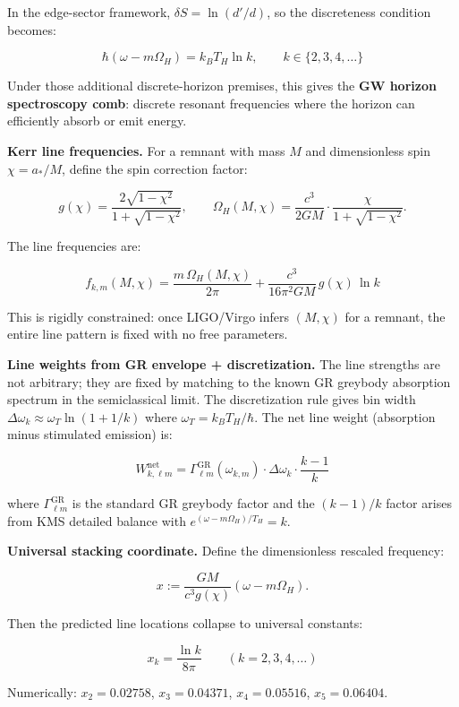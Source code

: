In the edge-sector framework, \(\delta S = \ln(d'/d)\), so the discreteness condition becomes:

\[
\hbar(\omega - m\Omega_H) = k_B T_H \ln k, \qquad k \in \{2, 3, 4, \ldots\}
\]

Under those additional discrete-horizon premises, this gives the \textbf{GW horizon spectroscopy comb}: discrete resonant frequencies where the horizon can efficiently absorb or emit energy.

\textbf{Kerr line frequencies.} For a remnant with mass \(M\) and dimensionless spin \(\chi = a_*/M\), define the spin correction factor:

\[
g(\chi) = \frac{2\sqrt{1-\chi^2}}{1+\sqrt{1-\chi^2}}, \qquad
\Omega_H(M,\chi) = \frac{c^3}{2GM} \cdot \frac{\chi}{1+\sqrt{1-\chi^2}}.
\]

The line frequencies are:

\[
f_{k,m}(M,\chi) = \frac{m \, \Omega_H(M,\chi)}{2\pi} + \frac{c^3}{16\pi^2 GM} \, g(\chi) \, \ln k
\]

This is rigidly constrained: once LIGO/Virgo infers \((M, \chi)\) for a remnant, the entire line pattern is fixed with no free parameters.

\textbf{Line weights from GR envelope + discretization.} The line strengths are not arbitrary; they are fixed by matching to the known GR greybody absorption spectrum in the semiclassical limit. The discretization rule gives bin width \(\Delta\omega_k \approx \omega_T \ln(1 + 1/k)\) where \(\omega_T = k_B T_H/\hbar\). The net line weight (absorption minus stimulated emission) is:

\[
W^{\mathrm{net}}_{k,\ell m} = \Gamma^{\mathrm{GR}}_{\ell m}(\omega_{k,m}) \cdot \Delta\omega_k \cdot \frac{k-1}{k}
\]

where \(\Gamma^{\mathrm{GR}}_{\ell m}\) is the standard GR greybody factor and the \((k-1)/k\) factor arises from KMS detailed balance with \(e^{(\omega-m\Omega_H)/T_H} = k\).

\textbf{Universal stacking coordinate.} Define the dimensionless rescaled frequency:

\[
x := \frac{GM}{c^3 g(\chi)}(\omega - m\Omega_H).
\]

Then the predicted line locations collapse to universal constants:

\[
x_k = \frac{\ln k}{8\pi} \qquad (k = 2, 3, 4, \ldots)
\]

Numerically: \(x_2 = 0.02758\), \(x_3 = 0.04371\), \(x_4 = 0.05516\), \(x_5 = 0.06404\).

